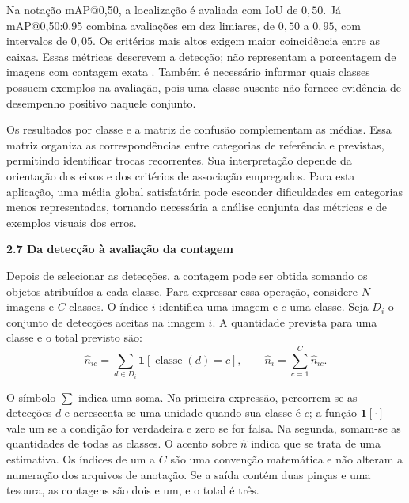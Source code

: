 Na notação mAP@0,50, a localização é avaliada com IoU de $0{,}50$. Já mAP@0,50:0,95 combina avaliações em dez limiares, de $0{,}50$ a $0{,}95$, com intervalos de $0{,}05$. Os critérios mais altos exigem maior coincidência entre as caixas. Essas métricas descrevem a detecção; não representam a porcentagem de imagens com contagem exata \parencite{ultralyticsValidacao}. Também é necessário informar quais classes possuem exemplos na avaliação, pois uma classe ausente não fornece evidência de desempenho positivo naquele conjunto.

Os resultados por classe e a matriz de confusão complementam as médias. Essa matriz organiza as correspondências entre categorias de referência e previstas, permitindo identificar trocas recorrentes. Sua interpretação depende da orientação dos eixos e dos critérios de associação empregados. Para esta aplicação, uma média global satisfatória pode esconder dificuldades em categorias menos representadas, tornando necessária a análise conjunta das métricas e de exemplos visuais dos erros.

\vspace{\baselineskip}
{}
\noindent\textbf{2.7 Da detecção à avaliação da contagem}\par
\vspace{\baselineskip}

Depois de selecionar as detecções, a contagem pode ser obtida somando os objetos atribuídos a cada classe. Para expressar essa operação, considere $N$ imagens e $C$ classes. O índice $i$ identifica uma imagem e $c$ uma classe. Seja $D_i$ o conjunto de detecções aceitas na imagem $i$. A quantidade prevista para uma classe e o total previsto são:
\begin{equation}
\widehat{n}_{ic}=\sum_{d\in D_i}\mathbf{1}[\operatorname{classe}(d)=c],
\qquad
\widehat{n}_i=\sum_{c=1}^{C}\widehat{n}_{ic}.
\label{eq:fund_contagem}
\end{equation}

O símbolo $\sum$ indica uma soma. Na primeira expressão, percorrem-se as detecções $d$ e acrescenta-se uma unidade quando sua classe é $c$; a função $\mathbf{1}[\cdot]$ vale um se a condição for verdadeira e zero se for falsa. Na segunda, somam-se as quantidades de todas as classes. O acento sobre $\widehat{n}$ indica que se trata de uma estimativa. Os índices de um a $C$ são uma convenção matemática e não alteram a numeração dos arquivos de anotação. Se a saída contém duas pinças e uma tesoura, as contagens são dois e um, e o total é três.

